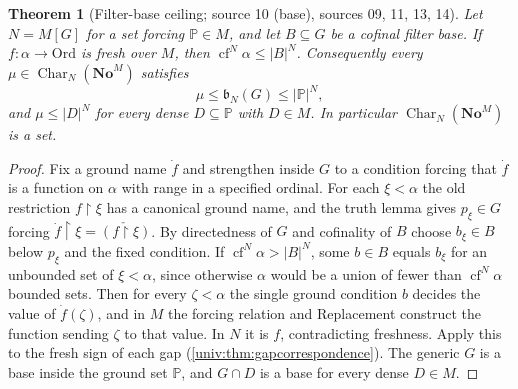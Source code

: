 \documentclass[11pt,letterpaper]{article}
\numberwithin{equation}{section}
\newtheorem{theorem}{Theorem}[section]
\theoremstyle{definition}
\theoremstyle{remark}
\newcommand{\No}{\mathbf{No}}
\newcommand{\NoM}{\No^{M}}
\newcommand{\Ord}{\mathrm{Ord}}
\newcommand{\cf}{\operatorname{cf}}
\newcommand{\res}{\mathbin{\upharpoonright}}
\newcommand{\abs}[1]{\lvert#1\rvert}
\newcommand{\Char}{\operatorname{Char}}
\begin{document}
\begin{theorem}[Filter-base ceiling; source 10 (base), sources 09, 11, 13, 14]\label{univ:gs:thm:filterbase}
Let $N=M[G]$ for a set forcing $\mathbb P\in M$, and let $B\subseteq G$ be a cofinal
filter base. If $f:\alpha\to\Ord$ is fresh over $M$, then $\cf^N\alpha\le\abs B^N$.
Consequently every $\mu\in\Char_N(\NoM)$ satisfies
\[
 \mu\le\mathfrak b_N(G)\le\abs{\mathbb P}^N,
\]
and $\mu\le\abs D^N$ for every dense $D\subseteq\mathbb P$ with $D\in M$. In
particular $\Char_N(\NoM)$ is a set.
\end{theorem}
\begin{proof}
Fix a ground name $\dot f$ and strengthen inside $G$ to a condition forcing that
$\dot f$ is a function on $\alpha$ with range in a specified ordinal. For each
$\xi<\alpha$ the old restriction $f\res\xi$ has a canonical ground name, and the
truth lemma gives $p_\xi\in G$ forcing $\dot f\res\xi=\check{(f\res\xi)}$. By
directedness of $G$ and cofinality of $B$ choose $b_\xi\in B$ below $p_\xi$ and
the fixed condition. If $\cf^N\alpha>\abs B^N$, some $b\in B$ equals $b_\xi$ for an
unbounded set of $\xi<\alpha$, since otherwise $\alpha$ would be a union of fewer
than $\cf^N\alpha$ bounded sets. Then for every $\zeta<\alpha$ the single ground
condition $b$ decides the value of $\dot f(\zeta)$, and in $M$ the forcing relation
and Replacement construct the function sending $\zeta$ to that value. In $N$ it is
$f$, contradicting freshness. Apply this to the fresh sign of each gap
(\cref{univ:thm:gapcorrespondence}). The generic $G$ is a base inside the ground
set $\mathbb P$, and $G\cap D$ is a base for every dense $D\in M$.
\end{proof}
\end{document}
